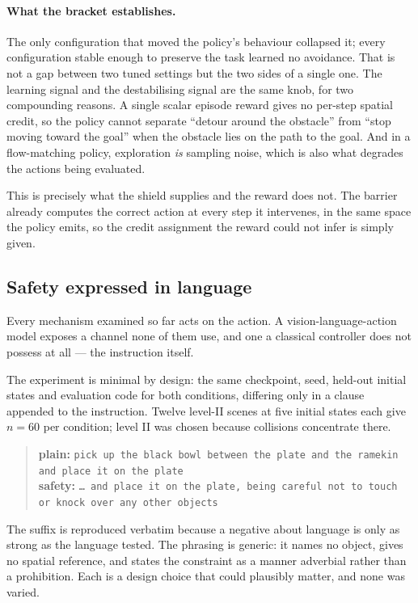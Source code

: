 \paragraph{What the bracket establishes.}
The only configuration that moved the policy's behaviour collapsed it; every configuration stable
enough to preserve the task learned no avoidance. That is not a gap between two tuned settings but
the two sides of a single one. The learning signal and the destabilising signal are the same knob,
for two compounding reasons. A single scalar episode reward gives no per-step spatial credit, so
the policy cannot separate ``detour around the obstacle'' from ``stop moving toward the goal'' when
the obstacle lies on the path to the goal. And in a flow-matching policy, exploration \emph{is}
sampling noise, which is also what degrades the actions being evaluated.

This is precisely what the shield supplies and the reward does not. The barrier already computes
the correct action at every step it intervenes, in the same space the policy emits, so the credit
assignment the reward could not infer is simply given.

\subsection*{Safety expressed in language}

Every mechanism examined so far acts on the action. A vision-language-action model exposes a
channel none of them use, and one a classical controller does not possess at all --- the
instruction itself.

The experiment is minimal by design: the same checkpoint, seed, held-out initial states and
evaluation code for both conditions, differing only in a clause appended to the instruction. Twelve
level-II scenes at five initial states each give $n = 60$ per condition; level II was chosen
because collisions concentrate there.

\begin{quote}\small
\textbf{plain:} \texttt{pick up the black bowl between the plate and the ramekin and place it on
the plate}\\[3pt]
\textbf{safety:} \texttt{\dots{} and place it on the plate, being careful not to touch or knock
over any other objects}
\end{quote}

The suffix is reproduced verbatim because a negative about language is only as strong as the
language tested. The phrasing is generic: it names no object, gives no spatial reference, and
states the constraint as a manner adverbial rather than a prohibition. Each is a design choice that
could plausibly matter, and none was varied.

